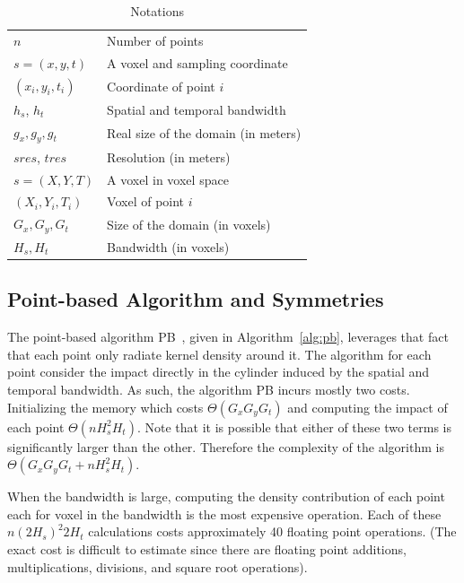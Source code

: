 \documentclass[10pt, conference, compsocconf]{IEEEtran}
\begin{document}
\begin{table}
  \centering
  \begin{tabular}{|l|l|}
    \hline 
    $n$ & Number of points\\
    $s = (x,y,t)$ & A voxel and sampling coordinate\\
    $(x_i, y_i, t_i)$ & Coordinate of point $i$\\
    $h_s$, $h_t$ & Spatial and temporal bandwidth \\ 
    $g_x, g_y, g_t$ & Real size of the domain (in meters) \\
    \hline
    $sres$, $tres$ & Resolution (in meters) \\
    $s = (X,Y,T)$ & A voxel in voxel space\\
    $(X_i, Y_i, T_i)$ & Voxel of point $i$\\
    $G_x, G_y, G_t$ & Size of the domain (in voxels)\\
    $H_s, H_t$ & Bandwidth (in voxels) \\
    \hline 
  \end{tabular}
  \caption{Notations}
  \label{tab:notation}
  \vspace*{-3em}
\end{table}


\subsection{Point-based Algorithm and Symmetries}

The point-based algorithm PB~\cite{Saule17-ICPP}, given in
Algorithm~\ref{alg:pb}, leverages that fact that each point only
radiate kernel density around it. The algorithm for each point
consider the impact directly in the cylinder induced by the spatial
and temporal bandwidth. As such, the algorithm PB incurs mostly two
costs. Initializing the memory which costs $\Theta(G_x G_y G_t)$ and
computing the impact of each point $\Theta(n H_s^2 H_t)$. Note that it
is possible that either of these two terms is significantly larger
than the other. Therefore the complexity of the algorithm is
$\Theta(G_x G_y G_t + n H_s^2 H_t)$.

When the bandwidth is large, computing the density contribution of each
point each for voxel in the bandwidth is the most expensive
operation. Each of these $n (2  H_s)^2  2 H_t$ calculations costs
approximately 40 floating point operations. (The exact cost is
difficult to estimate since there are floating point additions,
multiplications, divisions, and square root operations).
\end{document}
